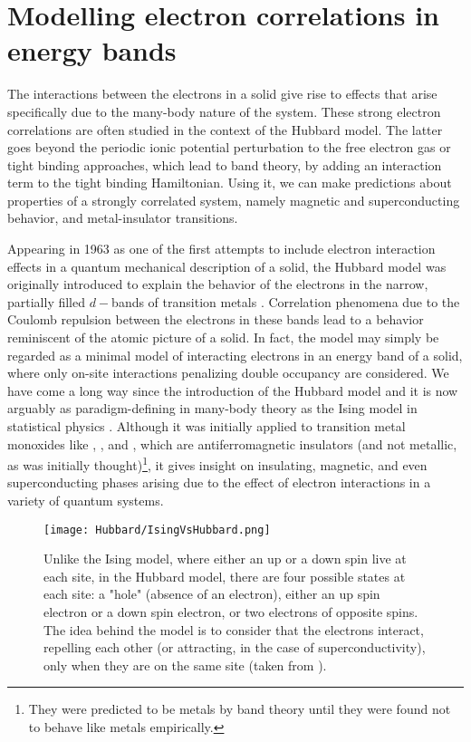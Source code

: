 \section{Modelling electron correlations in energy bands}\label{sec:intro}

The interactions between the electrons in a solid give rise to effects that arise specifically due to the many-body nature of the system.
These strong electron correlations are often studied in the context of the Hubbard model.
The latter goes beyond the periodic ionic potential perturbation to the free electron gas or tight binding approaches, which lead to band theory, by adding an interaction term to the tight binding Hamiltonian. 
Using it, we can make predictions about properties of a strongly correlated system, namely magnetic and superconducting behavior, and metal-insulator transitions.

Appearing in 1963 as one of the first attempts to include electron interaction effects in a quantum mechanical description of a solid, the Hubbard model was originally introduced to explain the behavior of the electrons in the narrow, partially filled $d-$bands of transition metals \cite{hubbard_electron_1963}.
Correlation phenomena due to the Coulomb repulsion between the electrons in these bands lead to a behavior reminiscent of the atomic picture of a solid.
In fact, the model may simply be regarded as a minimal model of interacting electrons in an energy band of a solid, where only on-site interactions penalizing double occupancy are considered.
We have come a long way since the introduction of the Hubbard model and it is now arguably as paradigm-defining in many-body theory as the Ising model in statistical physics \cite{fazekas_lecture_1999, mahan_many-particle_2000, altland_condensed_2010}.
Although it was initially applied to transition metal monoxides like , , and , which are antiferromagnetic insulators (and not metallic, as was initially thought)\footnote{They were predicted to be metals by band theory until they were found not to behave like metals empirically.}, it gives insight on insulating, magnetic, and even superconducting phases arising due to the effect of electron interactions in a variety of quantum systems.
\begin{figure}[H]
	\centering
\texttt{[image: Hubbard/IsingVsHubbard.png]}
	\caption[Graphical comparison between the Ising and the Hubbard models.]{Unlike the Ising model, where either an up or a down spin live at each site, in the Hubbard model, there are four possible states at each site: a "hole" (absence of an electron), either an up spin electron or a down spin electron, or two electrons of opposite spins.
	The idea behind the model is to consider that the electrons interact, repelling each other (or attracting, in the case of superconductivity), only when they are on the same site (taken from \cite{hayes_hip-hop_2009}).}
	\label{fig:IsingVsHubbard}
\end{figure}

